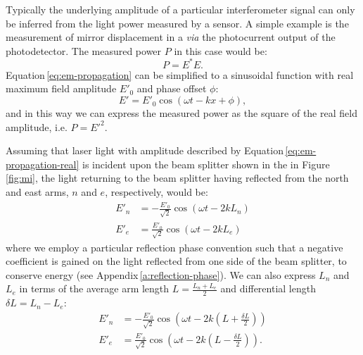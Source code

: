 Typically the underlying amplitude of a particular interferometer signal can only be inferred from the light power measured by a sensor. A simple example is the measurement of mirror displacement in a \MI{} \emph{via} the photocurrent output of the photodetector. The measured power $P$ in this case would be:
\begin{equation}
  P = E^{\ast} E.
\end{equation}
Equation\,\ref{eq:em-propagation} can be simplified to a sinusoidal function with real maximum field amplitude $E'_0$ and phase offset $\phi$:
\begin{equation}
  \label{eq:em-propagation-real}
  E' = E'_0 \cos \left( \omega t - kx + \phi \right),
\end{equation}
and in this way we can express the measured power as the square of the real field amplitude, i.e. $P = E'^2$.

Assuming that laser light with amplitude described by Equation\,\ref{eq:em-propagation-real} is incident upon the beam splitter shown in the \MI{} in Figure\,\ref{fig:mi}, the light returning to the beam splitter having reflected from the north and east arms, $n$ and $e$, respectively, would be:
\begin{align}
  E'_n &= -\frac{E'_0}{\sqrt{2}} \cos \left( \omega t - 2kL_n \right) \\
  E'_e &= \frac{E'_0}{\sqrt{2}} \cos \left( \omega t - 2kL_e \right)
\end{align}
where we employ a particular reflection phase convention such that a negative coefficient is gained on the light reflected from one side of the beam splitter, to conserve energy (see Appendix\,\ref{a:reflection-phase}). We can also express $L_n$ and $L_e$ in terms of the average arm length $L = \frac{L_n + L_e}{2}$ and differential length $\delta L = L_n - L_e$:
\begin{align}
  E'_n &= -\frac{E'_0}{\sqrt{2}} \cos \left( \omega t - 2k \left( L + \frac{\delta L}{2} \right) \right) \\
  E'_e &= \frac{E'_0}{\sqrt{2}} \cos \left( \omega t - 2k \left( L - \frac{\delta L}{2} \right) \right).
\end{align}

